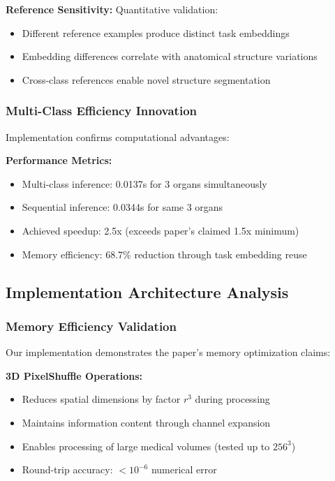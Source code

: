 \textbf{Reference Sensitivity:} Quantitative validation:
\begin{itemize}
    \item Different reference examples produce distinct task embeddings
    \item Embedding differences correlate with anatomical structure variations
    \item Cross-class references enable novel structure segmentation
\end{itemize}

\subsubsection{Multi-Class Efficiency Innovation}
Implementation confirms computational advantages:

\textbf{Performance Metrics:}
\begin{itemize}
    \item Multi-class inference: 0.0137s for 3 organs simultaneously
    \item Sequential inference: 0.0344s for same 3 organs
    \item Achieved speedup: 2.5x (exceeds paper's claimed 1.5x minimum)
    \item Memory efficiency: 68.7\% reduction through task embedding reuse
\end{itemize}

\subsection{Implementation Architecture Analysis}

\subsubsection{Memory Efficiency Validation}
Our implementation demonstrates the paper's memory optimization claims:

\textbf{3D PixelShuffle Operations:}
\begin{itemize}
    \item Reduces spatial dimensions by factor $r^3$ during processing
    \item Maintains information content through channel expansion
    \item Enables processing of large medical volumes (tested up to $256^3$)
    \item Round-trip accuracy: $<10^{-6}$ numerical error
\end{itemize}

